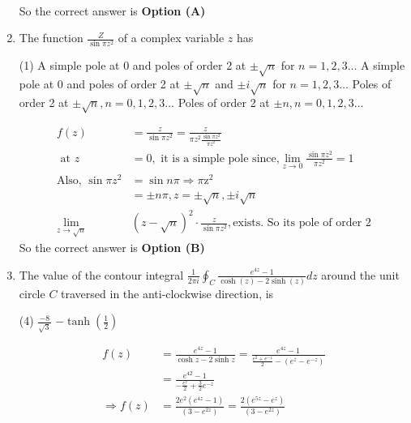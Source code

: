 \begin{note}
\begin{enumerate}[label=\color{ocre}\textbf{\arabic*.}]
\begin{answer}
\begin{align*}
		\end{align*}
		So the correct answer is \textbf{Option (A)}
	\end{answer}
	\item  The function $\frac{Z}{\sin \pi z^{2}}$ of a complex variable $z$ has
	{}
	\begin{tasks}(1)
		\task[\textbf{A.}] A simple pole at 0 and poles of order 2 at $\pm \sqrt{n}$ for $n=1,2,3 \ldots$
		\task[\textbf{B.}] A simple pole at 0 and poles of order 2 at $\pm \sqrt{n}$ and $\pm i \sqrt{n}$ for $n=1,2,3 \ldots$
		\task[\textbf{C.}] Poles of order 2 at $\pm \sqrt{n}, n=0,1,2,3 \ldots$
		\task[\textbf{D.}] Poles of order 2 at $\pm n, n=0,1,2,3 \ldots$
	\end{tasks}
	\begin{answer}
		\begin{align*}
		f(z)&=\frac{z}{\sin \pi z^{2}}=\frac{z}{\pi z^{2} \frac{\sin \pi z^{2}}{\pi z^{2}}}\\
		\text{	at }z&=0,\text{ it is a simple pole since,} \lim _{z \rightarrow 0} \frac{\sin \pi z^{2}}{\pi z^{2}}=1\\
		\text{Also, }\sin \pi z^{2}&=\sin n \pi \Rightarrow \pi \mathrm{z}^{2}\\&=\pm n \pi, z=\pm \sqrt{n}, \pm i \sqrt{n}\\
		\lim _{z \rightarrow \sqrt{n}}&(z-\sqrt{n})^{2} \cdot \frac{z}{\sin \pi z^{2}}, \text{exists. So its pole of order 2}
		\end{align*}
		So the correct answer is \textbf{Option (B)}
	\end{answer}
	\item The value of the contour integral $\frac{1}{2 \pi i} \oint_{C} \frac{e^{4 z}-1}{\cosh (z)-2 \sinh (z)} d z$ around the unit circle $C$ traversed in the anti-clockwise direction, is
	{}
	\begin{tasks}(4)
		\task[\textbf{C.}] $\frac{-8}{\sqrt{3}}$
		\task[\textbf{D.}] $-\tanh \left(\frac{1}{2}\right)$
	\end{tasks}
	\begin{answer}
		\begin{align*}
		f(z)&=\frac{e^{4 z}-1}{\cosh z-2 \sinh z}=\frac{e^{4 z}-1}{\frac{e^{2}+e^{-z}}{2}-\left(e^{z}-e^{-z}\right)}\\&=\frac{e^{42}-1}{-\frac{e^{z}}{2}+\frac{3}{2} e^{-z}}\\
		\Rightarrow f(z)&=\frac{2 e^{2}\left(e^{4 z}-1\right)}{\left(3-e^{2 z}\right)}=\frac{2\left(e^{5 z}-e^{z}\right)}{\left(3-e^{2 z}\right)}\\

\end{align*}
\end{answer}
\end{enumerate}
\end{note}
